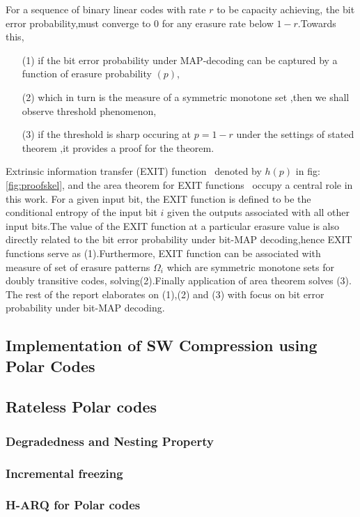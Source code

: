 \documentclass[
11pt, %
a4paper, %
oneside, %
headinclude,footinclude, %
BCOR5mm, %
]{scrartcl}
\begin{document}
For a sequence of binary linear codes with rate $r$ to be capacity achieving, the bit error probability,must converge to $0$ for any erasure rate below $1-r$.Towards this, 
\begin{enumerate}
\item[(1)]if the bit error probability under MAP-decoding can be captured by a function of erasure probability $(p)$,
\item[(2)]which in turn is the measure of a symmetric monotone set ,then we shall observe threshold phenomenon,
\item[(3)] if the threshold is sharp occuring at $p=1-r$ under the settings of stated theorem ,it provides a proof for the theorem.
\end{enumerate}
Extrinsic information transfer (EXIT) function~\cite{exit} denoted by $h(p)$ in fig:\ref{fig:proofskel}, and the area theorem for EXIT functions~\cite{areathm} occupy a central role in this work. For a given input bit, the EXIT function is defined to be the conditional entropy of the input bit $i$ given the outputs associated with all other input bits.The value of the EXIT function at a particular erasure value is also directly related to the bit error probability under bit-MAP decoding,hence EXIT functions serve as (1).Furthermore, EXIT function can be associated with measure of set of erasure patterns $\Omega_i$ which are symmetric monotone sets for doubly transitive codes, solving(2).Finally application of area theorem solves (3).
The rest of the report elaborates on (1),(2) and (3) with focus on bit error probability under bit-MAP decoding.

\subsection{Implementation of SW Compression using Polar Codes}
\subsection{Rateless Polar codes}
\subsubsection{Degradedness and Nesting Property}
\subsubsection{Incremental freezing}
\subsubsection*{H-ARQ for Polar codes}
\end{document}
